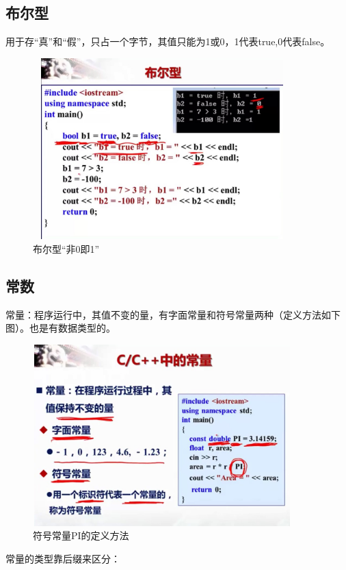 \documentclass[UTF8]{article}
\begin{document}
\subsection{布尔型}
用于存``真”和``假”，只占一个字节，其值只能为1或0，1代表true,0代表false。
\begin{figure}[!htb]
\centering
\includegraphics[width=10cm,height=7cm]{bool.jpg}
\caption{布尔型``非0即1”}
\hspace{0.05in}
\end{figure}

\subsection{常数}
常量：程序运行中，其值不变的量，有字面常量和符号常量两种（定义方法如下图）。也是有数据类型的。
\begin{figure}[!htb]
\centering
\includegraphics[width=10cm,height=7cm]{definechangliang.jpg}
\caption{符号常量PI的定义方法}
\hspace{0.05in}
\end{figure}

常量的类型靠后缀来区分：
\end{document}
